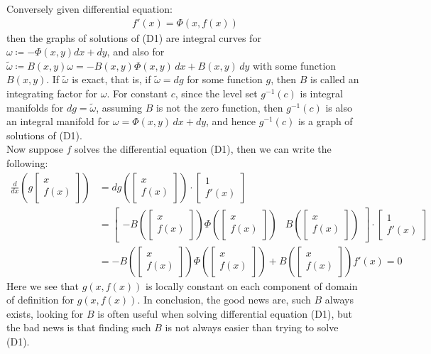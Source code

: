 \documentclass[15pt]{book}
\theoremstyle{break}
\theoremstyle{break}
\newcommand{\that}[1]{\widetilde{#1}}
\newcommand{\bmat}[1]{\begin{bmatrix} #1 \end{bmatrix}}
\begin{document}
Conversely given differential equation: 
\begin{align*}
f'(x) = \Phi(x,f(x)) \tag{D1}
\end{align*}
then the graphs of solutions of (D1) are integral curves for $\omega \coloneqq -\Phi(x,y)dx+dy$, and also for $\that{\omega} \coloneqq B(x,y) \omega = -B(x,y)\Phi(x,y)\, dx + B(x,y)\, dy$ with some function $B(x,y)$. If $\that{\omega}$ is exact, that is, if $\that{\omega} = dg$ for some function $g$, then $B$ is called an integrating factor for $\omega$. For constant $c$, since the level set $g^{-1}(c)$ is integral manifolds for $dg = \that{\omega}$, assuming $B$ is not the zero function, then $g^{-1}(c)$ is also an integral manifold for $\omega = \Phi(x,y)\, dx + dy$, and hence $g^{-1}(c)$ is a graph of solutions of (D1).\\

Now suppose $f$ solves the differential equation (D1), then we can write the following:
\begin{align*}
\frac{d}{dx} \left( g\bmat{x \\ f(x)}\right) &= dg\left(\bmat{x\\ f(x)}\right) \cdot \bmat{1 \\ f'(x)} \\
&= \bmat{-B\left(\bmat{x \\ f(x)} \right)\Phi\left(\bmat{x \\ f(x)} \right) & B\left(\bmat{x \\ f(x)} \right)} \cdot \bmat{1 \\ f'(x)} \\
&= -B\left(\bmat{x\\ f(x)}\right) \Phi\left( \bmat{x\\f(x)}\right) + B\left( \bmat{x\\ f(x)}\right) f'(x) = 0
\end{align*}
Here we see that $g(x,f(x))$ is locally constant on each component of domain of definition for $g(x,f(x))$. In conclusion, the good news are, such $B$ always exists, looking for $B$ is often useful when solving differential equation (D1), but the bad news is that finding such $B$ is not always easier than trying to solve (D1). \\
\newpage
\end{document}
